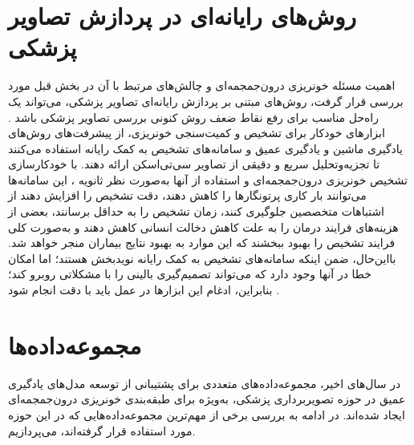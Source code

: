 \section{روش‌های رایانه‌ای در پردازش تصاویر پزشکی}
اهمیت مسئله خونریزی درون‌جمجمه‌ای و چالش‌های مرتبط با آن در بخش قبل مورد بررسی قرار گرفت، روش‌های مبتنی‌ بر پردازش رایانه‌ای
تصاویر پزشکی، می‌تواند یک راه‌حل مناسب برای رفع نقاط ضعف روش کنونی بررسی تصاویر پزشکی باشد
\cite{grewal2018radnet, arbabshirani2018advanced, ye2019precise, lee2019explainable, chang2018hybrid, chilamkurthy2018deep, titano2018automated, kuo2019expert}.
 ابزارهای خودکار برای تشخیص و کمیت‌سنجی خونریزی، از پیشرفت‌های روش‌های یادگیری ماشین 
و یادگیری عمیق
 و سامانه‌های
  تشخیص به کمک رایانه 
 استفاده می‌کنند تا تجزیه‌وتحلیل سریع و دقیقی از تصاویر سی‌تی‌اسکن ارائه دهند. با خودکارسازی تشخیص خونریزی درون‌جمجمه‌ای و استفاده از آنها به‌صورت نظر ثانویه
 ، این سامانه‌ها می‌توانند بار کاری پرتونگار‌ها را کاهش دهند، دقت تشخیص را افزایش دهند از اشتباهات متخصصین جلوگیری کنند، زمان تشخیص را به حداقل برسانند، بعضی از هزینه‌های فرایند درمان را به علت کاهش دخالت انسانی کاهش دهند و به‌صورت کلی فرایند تشخیص را بهبود ببخشند که این موارد به بهبود نتایج بیماران منجر خواهد شد. بااین‌حال، ضمن اینکه سامانه‌های تشخیص به کمک رایانه نویدبخش هستند؛ اما امکان خطا در آنها وجود دارد که می‌تواند تصمیم‌گیری بالینی را با مشکلاتی روبرو کند؛ بنابراین، ادغام این ابزارها در عمل باید با دقت انجام شود \cite{titano2018automated}.
 
 
 
 \section{مجموعه‌داده‌ها}
 
 
 در سال‌های اخیر، مجموعه‌داده‌های متعددی برای پشتیبانی از توسعه مدل‌های
  یادگیری عمیق در حوزه تصویربرداری پزشکی، به‌ویژه برای طبقه‌بندی خونریزی درون‌جمجمه‌ای ایجاد شده‌اند. در ادامه به بررسی برخی از مهم‌ترین مجموعه‌داده‌هایی که در این حوزه مورد استفاده قرار گرفته‌اند، می‌پردازیم.
 
